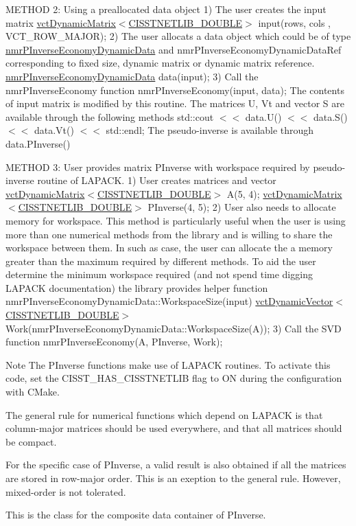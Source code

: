M\+E\+T\+H\+O\+D 2\+: Using a preallocated data object 1) The user creates the input matrix \hyperlink{classvct_dynamic_matrix}{vct\+Dynamic\+Matrix$<$\+C\+I\+S\+S\+T\+N\+E\+T\+L\+I\+B\+\_\+\+D\+O\+U\+B\+L\+E$>$} input(rows, cols , V\+C\+T\+\_\+\+R\+O\+W\+\_\+\+M\+A\+J\+O\+R); 2) The user allocats a data object which could be of type \hyperlink{classnmr_p_inverse_economy_dynamic_data}{nmr\+P\+Inverse\+Economy\+Dynamic\+Data} and nmr\+P\+Inverse\+Economy\+Dynamic\+Data\+Ref corresponding to fixed size, dynamic matrix or dynamic matrix reference. \hyperlink{classnmr_p_inverse_economy_dynamic_data}{nmr\+P\+Inverse\+Economy\+Dynamic\+Data} data(input); 3) Call the nmr\+P\+Inverse\+Economy function nmr\+P\+Inverse\+Economy(input, data); The contents of input matrix is modified by this routine. The matrices U, Vt and vector S are available through the following methods std\+::cout $<$$<$ data.\+U() $<$$<$ data.\+S() $<$$<$ data.\+Vt() $<$$<$ std\+::endl; The pseudo-\/inverse is available through data.\+P\+Inverse()

M\+E\+T\+H\+O\+D 3\+: User provides matrix P\+Inverse with workspace required by pseudo-\/inverse routine of L\+A\+P\+A\+C\+K. 1) User creates matrices and vector \hyperlink{classvct_dynamic_matrix}{vct\+Dynamic\+Matrix$<$\+C\+I\+S\+S\+T\+N\+E\+T\+L\+I\+B\+\_\+\+D\+O\+U\+B\+L\+E$>$} A(5, 4); \hyperlink{classvct_dynamic_matrix}{vct\+Dynamic\+Matrix$<$\+C\+I\+S\+S\+T\+N\+E\+T\+L\+I\+B\+\_\+\+D\+O\+U\+B\+L\+E$>$} P\+Inverse(4, 5); 2) User also needs to allocate memory for workspace. This method is particularly useful when the user is using more than one numerical methods from the library and is willing to share the workspace between them. In such as case, the user can allocate the a memory greater than the maximum required by different methods. To aid the user determine the minimum workspace required (and not spend time digging L\+A\+P\+A\+C\+K documentation) the library provides helper function nmr\+P\+Inverse\+Economy\+Dynamic\+Data\+::\+Workspace\+Size(input) \hyperlink{classvct_dynamic_vector}{vct\+Dynamic\+Vector$<$\+C\+I\+S\+S\+T\+N\+E\+T\+L\+I\+B\+\_\+\+D\+O\+U\+B\+L\+E$>$} Work(nmr\+P\+Inverse\+Economy\+Dynamic\+Data\+::\+Workspace\+Size(\+A)); 3) Call the S\+V\+D function nmr\+P\+Inverse\+Economy(\+A, P\+Inverse, Work);

\begin{DoxyNote}{Note}
The P\+Inverse functions make use of L\+A\+P\+A\+C\+K routines. To activate this code, set the C\+I\+S\+S\+T\+\_\+\+H\+A\+S\+\_\+\+C\+I\+S\+S\+T\+N\+E\+T\+L\+I\+B flag to O\+N during the configuration with C\+Make. 

The general rule for numerical functions which depend on L\+A\+P\+A\+C\+K is that column-\/major matrices should be used everywhere, and that all matrices should be compact. 

For the specific case of P\+Inverse, a valid result is also obtained if all the matrices are stored in row-\/major order. This is an exeption to the general rule. However, mixed-\/order is not tolerated.
\end{DoxyNote}
This is the class for the composite data container of P\+Inverse. 

